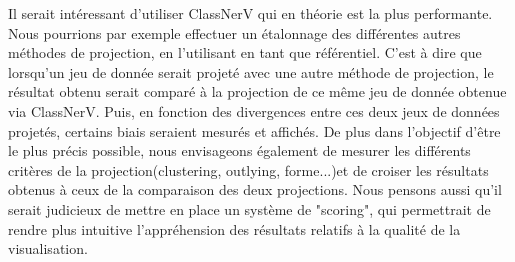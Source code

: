 Il serait intéressant d'utiliser ClassNerV qui en théorie est la plus performante. Nous pourrions par exemple 
effectuer un étalonnage des différentes autres méthodes de projection, en l'utilisant en tant que référentiel. 
C'est à dire que lorsqu'un jeu de donnée serait projeté avec une autre méthode de projection, le résultat obtenu serait comparé à la projection de ce même jeu de donnée obtenue via ClassNerV.
Puis, en fonction des divergences entre ces deux jeux de données projetés, certains biais seraient mesurés et affichés.
De plus dans l'objectif d'être le plus précis possible, nous envisageons également de mesurer les différents critères de la projection(clustering, outlying, forme...)et de croiser les résultats obtenus à ceux de la comparaison des deux projections.
Nous pensons aussi qu'il serait judicieux de mettre en place un système de "scoring", qui permettrait de rendre plus intuitive l'appréhension des résultats relatifs à la qualité de la visualisation. 

